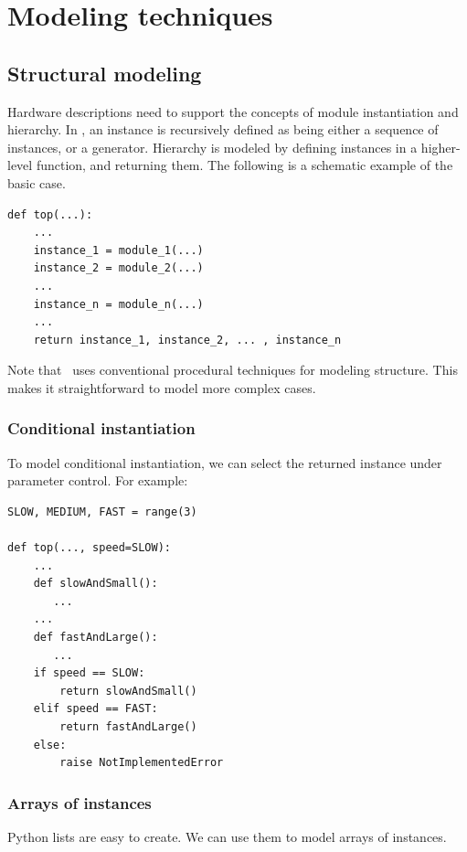 \chapter{Modeling techniques \label{model}}

\section{Structural modeling \label{model-structure}}

Hardware descriptions need to support the concepts of module
instantiation and hierarchy.  In \myhdl{}, an instance is recursively
defined as being either a sequence of instances, or a generator.
Hierarchy is modeled by defining instances in a higher-level
function, and returning them.  The following is a schematic example
of the basic case.

\begin{verbatim}
def top(...):
    ...
    instance_1 = module_1(...)
    instance_2 = module_2(...)
    ...
    instance_n = module_n(...)
    ... 
    return instance_1, instance_2, ... , instance_n
\end{verbatim}

Note that \myhdl\ uses conventional procedural techniques
for modeling structure. This makes it straightforward
to model more complex cases.

\subsection{Conditional instantiation \label{model-conf}}

To model conditional instantiation, we can
select the returned instance under parameter control.
For example:

\begin{verbatim}
SLOW, MEDIUM, FAST = range(3)

def top(..., speed=SLOW):
    ...
    def slowAndSmall():
       ...
    ...
    def fastAndLarge():
       ...
    if speed == SLOW:
        return slowAndSmall()
    elif speed == FAST:
        return fastAndLarge()
    else:
        raise NotImplementedError
\end{verbatim}


\subsection{Arrays of instances \label{model-instarray}}

Python lists are easy to create. We can use them
to model arrays of instances. 

